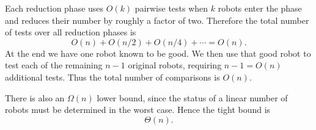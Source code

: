 \documentclass[11pt,addpoints,answers]{exam}
\theoremstyle{plain}            %
\theoremstyle{definition}       %
\theoremstyle{remark}           %
\begin{document}
\begin{questions}
\begin{parts}
\begin{solution}
Each reduction phase uses \(O(k)\) pairwise tests when \(k\) robots enter the phase and reduces their number by roughly a factor of two. Therefore the total number of tests over all reduction phases is
\[
O(n)+O(n/2)+O(n/4)+\cdots=O(n).
\]
At the end we have one robot known to be good. We then use that good robot to test each of the remaining \(n-1\) original robots, requiring \(n-1=O(n)\) additional tests. Thus the total number of comparisons is \(O(n)\).

There is also an \(\Omega(n)\) lower bound, since the status of a linear number of robots must be determined in the worst case. Hence the tight bound is
\[
\boxed{\Theta(n)}.
\]
\end{solution}
    
\end{parts}


\end{questions}
\end{document}
